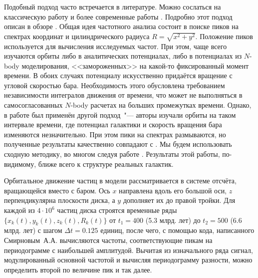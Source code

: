 \documentclass{trlnotes}
\begin{document}
Подобный подход часто встречается в литературе. Можно сослаться на классическую работу \citet{binney1982} и
более современные работы  \citep{athanassoula2002,portail2015,valluri2016}. Подробно этот подход описан в обзоре
\citet{athanassoula2013}. Общая идея частотного анализа состоит в поиске пиков на спектрах координат и
цилиндрического радиуса $R = \sqrt{x^2 + y^2}$. Положение пиков используется для  вычисления исследуемых частот.
При этом, чаще всего изучаются орбиты либо в аналитических потенциалах, либо в потенциалах из $N$-body моделирования,  <<замороженных>> на какой-то
фиксированный момент времени. В обоих случаях потенциалу искусственно
придаётся вращение с угловой скоростью бара. Необходимость этого обусловлена требованием независимости интегралов
движения от времени, что может не выполняться в самосогласованных $N$-body расчетах на больших промежутках времени. Однако,
в работе \citet{ceverino2007} был применён другой подход~"--- авторы изучали орбиты на таком интервале времени, где
потенциал галактики и скорость вращения бара изменяются незначительно. При этом пики на спектрах размываются, но
полученные результаты качественно совпадают с \cite{athanassoula2002a}.
Мы будем использовать сходную методику, во многом следуя работе \citet{gajda2016}. Результаты этой работы, по-видимому, ближе всего к структуре реальных галактик.

Орбитальное движение частиц в модели рассматривается в системе отсчёта, вращающейся вместо с баром. Ось $x$
направлена вдоль его большой оси, $z$ перпендикулярна плоскости диска, а $y$ дополняет их до правой тройки.  Для
каждой из $4\cdot 10^6$ частиц диска строятся временные ряды $\{x_k(t), y_k(t), z_k(t), R_k(t)\}$ от $t_1=400$ (5.3
млрд. лет) до $t_2=500$ (6.6 млрд. лет) с шагом $Δt = 0.125$ единиц, после чего, с помощью кода, написанного
Смирновым~А.А. \quest{} вычисляются частоты, соответствующие пикам на
периодограмме с наибольшей амплитудой. Вычитая из изначального ряда сигнал, модулированный основной частотой и
вычисляя периодограмму разности, можно определить второй по величине пик и так далее. 
\end{document}
